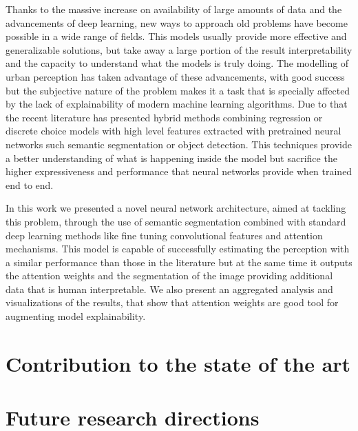 Thanks to the massive increase on availability of large amounts of data and the advancements
of deep learning, new ways to approach old problems have become possible in a wide
range of fields. This models usually provide more effective and generalizable solutions,
but take away a large portion of the result interpretability and the capacity to understand
what the models is truly doing. The modelling of urban perception has taken advantage
of these advancements, with good success but the subjective nature of the problem
makes it a task that is specially affected by the lack of explainability of modern
machine learning algorithms. Due to that the recent literature has presented hybrid methods
combining regression or discrete choice models with high level features extracted
with pretrained neural networks such semantic segmentation or object detection.
This techniques provide a better understanding of what is happening inside the model
but sacrifice the higher expressiveness and performance that neural networks
provide when trained end to end.

In this work we presented a novel neural network architecture, aimed at tackling this problem,
through the use of semantic segmentation combined with standard deep learning methods like
fine tuning convolutional features and attention mechanisms. This model is capable of
successfully estimating the perception  with a similar performance than those in the literature
but at the same time it outputs the attention weights and the segmentation of the image providing
additional data that is human interpretable. We also present an aggregated analysis and visualizations
of the results, that show that attention weights are good tool for augmenting model explainability.


\section{Contribution to the state of the art}

\section{Future research directions}